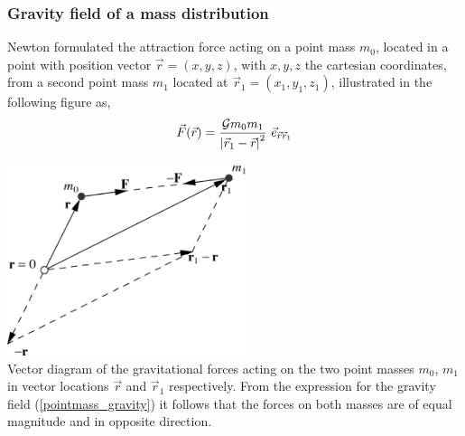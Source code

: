 \vspace{0.5cm}

\vspace{0.5cm}

\subsubsection{Gravity field of a mass distribution}
Newton formulated the attraction force acting on a point 
mass $m_0$,  located in a point with position vector ${\vec r}=(x,y,z)$,
with $x,y,z$ the cartesian coordinates,
from a second point mass $m_1$ located at
${\vec r}_1=(x_1,y_1,z_1)$, illustrated in the following figure as,
\begin{equation}
{\vec F} ({\vec r}) 
=\frac{{\cal G} m_0 m_1}{\left | {\vec r}_1 - {\vec r} \right | ^2} ~ 
          {\vec e}_{\vec{r} \vec{r}_1}
\label{pointmass_gravity}
\end{equation}

\begin{center}
\includegraphics[width=7cm]{images/gravity/gravity_diagram}\\
{\captionfont Vector diagram of the gravitational forces acting on the two 
point masses $m_0$, $m_1$ in vector locations ${\vec r}$ and
${\vec r}_1$ respectively.
From the expression for the gravity field (\ref{pointmass_gravity}) 
it follows that the forces on both masses
are of equal magnitude and in opposite direction.}
\end{center}


